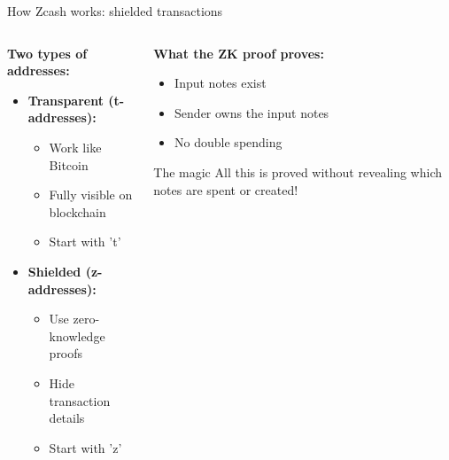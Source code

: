 \documentclass[aspectratio=169, lualatex, handout]{beamer}
\begin{document}
\begin{frame}{How Zcash works: shielded transactions}
	\begin{columns}[c]
		\begin{column}{0.5\textwidth}
			\textbf{Two types of addresses:}
			\begin{itemize}
				\item \textbf{Transparent (t-addresses):}
				      \begin{itemize}
					      \item Work like Bitcoin
					      \item Fully visible on blockchain
					      \item Start with 't'
				      \end{itemize}
				\item \textbf{Shielded (z-addresses):}
				      \begin{itemize}
					      \item Use zero-knowledge proofs
					      \item Hide transaction details
					      \item Start with 'z'
				      \end{itemize}
			\end{itemize}
		\end{column}
		\begin{column}{0.5\textwidth}
			\textbf{What the ZK proof proves:}
			\begin{itemize}
				\item Input notes exist
				\item Sender owns the input notes
				\item No double spending
			\end{itemize}
			\vspace{0.5em}
			\begin{alertblock}{The magic}
				All this is proved without revealing which notes are spent or created!
			\end{alertblock}
		\end{column}
	\end{columns}
\end{frame}
\end{document}
